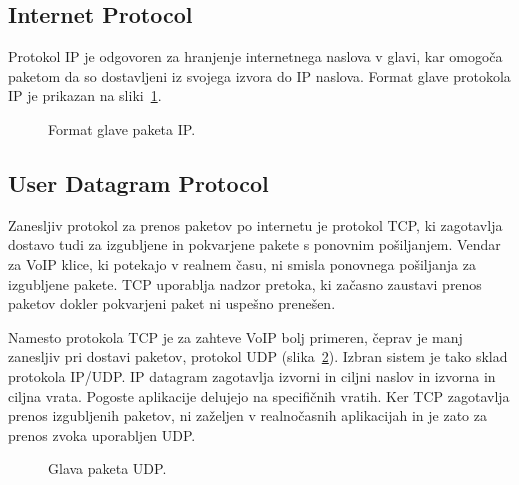 \documentclass{acm_proc_article-sp}
\begin{document}
\subsection{Internet Protocol}

Protokol IP\cite{IP} je odgovoren za hranjenje internetnega naslova v glavi, kar omogoča paketom da so dostavljeni iz svojega izvora do IP naslova. Format glave protokola IP je prikazan na sliki~\ref{fig:ip}.

\begin{figure}
\centering
{} %
\caption{Format glave paketa IP.}
\label{fig:ip}
\end{figure}


\subsection{User Datagram Protocol}
Zanesljiv protokol za prenos paketov po internetu je protokol TCP\cite{TCP}, ki zagotavlja dostavo tudi za izgubljene in pokvarjene pakete s ponovnim pošiljanjem. Vendar za VoIP klice, ki potekajo v realnem času, ni smisla ponovnega pošiljanja za izgubljene pakete. TCP uporablja nadzor pretoka, ki začasno zaustavi prenos paketov dokler pokvarjeni paket ni uspešno prenešen.

Namesto protokola TCP je za zahteve VoIP bolj primeren, čeprav je manj zanesljiv pri dostavi paketov, protokol UDP (slika~\ref{fig:udp}). Izbran sistem je tako sklad protokola IP/UDP. IP datagram zagotavlja izvorni in ciljni naslov in izvorna in ciljna vrata. Pogoste aplikacije delujejo na specifičnih vratih. Ker TCP zagotavlja prenos izgubljenih paketov, ni zaželjen v realnočasnih aplikacijah in je zato za prenos zvoka uporabljen UDP.

\begin{figure}
\centering
{} %
\caption{Glava paketa UDP.}
\label{fig:udp}
\end{figure}
\end{document}
